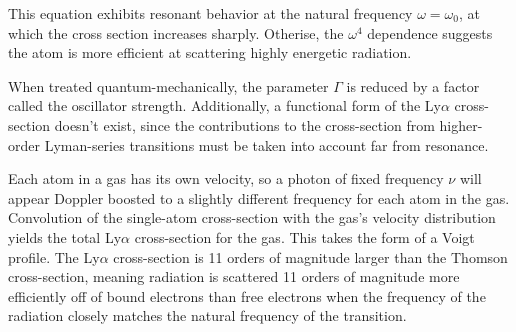 \documentclass[onecolumn]{aastex63}
\begin{document}
This equation exhibits resonant behavior at the natural frequency $\omega = \omega_0$, at which the cross section increases sharply. Otherise, the $\omega^4$ dependence suggests the atom is more efficient at scattering highly energetic radiation.

When treated quantum-mechanically, the parameter $\Gamma$ is reduced by a factor called the oscillator strength. Additionally, a functional form of the Ly$\alpha$ cross-section doesn't exist, since the contributions to the cross-section from higher-order Lyman-series transitions must be taken into account far from resonance.

Each atom in a gas has its own velocity, so a photon of fixed frequency $\nu$ will appear Doppler boosted to a slightly different frequency for each atom in the gas. Convolution of the single-atom cross-section with the gas's velocity distribution yields the total Ly$\alpha$ cross-section for the gas. This takes the form of a Voigt profile. The Ly$\alpha$ cross-section is 11 orders of magnitude larger than the Thomson cross-section, meaning radiation is scattered 11 orders of magnitude more efficiently off of bound electrons than free electrons when the frequency of the radiation closely matches the natural frequency of the transition.



\end{document}
